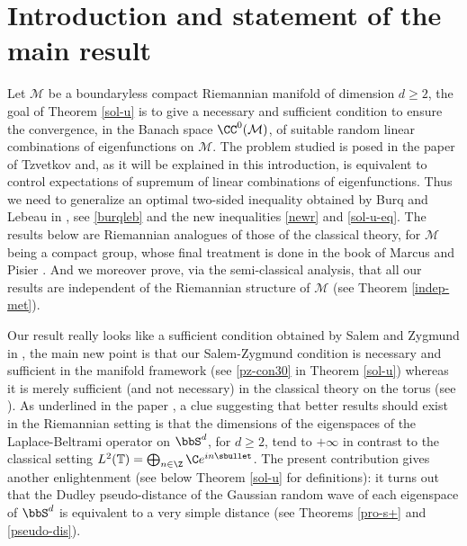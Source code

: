 \section{Introduction and statement of the main result}
Let $\mathcal{M}$ be a boundaryless compact Riemannian manifold of dimension $d\geq 2$, the goal of Theorem \ref{sol-u} is to give a necessary and sufficient condition to ensure the convergence, in the Banach space $\CC^0(\mathcal{M})$, of suitable random linear combinations of eigenfunctions on $\mathcal{M}$. The problem studied is posed in the paper of Tzvetkov \cite[p.\,XV]{Tzvetkov4} and, as it will be explained in this introduction, is equivalent to control expectations of supremum of linear combinations of eigenfunctions. Thus we need to generalize an optimal two-sided inequality obtained by Burq and Lebeau in \cite{burq-lebeau,burq-lebeau2}, see \eqref{burqleb} and the new inequalities \eqref{newr} and \eqref{sol-u-eq}.
The results below are Riemannian analogues of those of the classical theory, for $\mathcal{M}$ being a compact group, whose final treatment is done in the book of Marcus and Pisier \cite{pisier1981}. And we moreover prove, via the semi-classical analysis, that all our results are independent of the Riemannian structure of $\mathcal{M}$ (see Theorem \ref{indep-met}).%

Our result really looks like a sufficient condition obtained by Salem and Zygmund in \cite[p.\,291]{salem1954}, the main new point is that our Salem-Zygmund condition is necessary and sufficient in the manifold framework (see \eqref{pz-con30} in Theorem \ref{sol-u}) whereas it is merely sufficient (and not necessary) in the classical theory on the torus (see \cite[p.\,292]{salem1954}). As underlined in the paper \cite{burq-lebeau}, a clue suggesting that better results should exist in the Riemannian setting is that the dimensions of the eigenspaces of the Laplace-Beltrami operator on $\bbS^d$, for $d\geq 2$, tend to $+\infty$ in contrast to the classical setting $L^2(\mathbb{T})=\bigoplus_{n\in \Z} \C e^{in\sbullet}$. The present contribution gives another enlightenment (see \hbox{below} Theorem \ref{sol-u} for definitions): it turns out that the Dudley pseudo-distance of the Gaussian random wave of each eigenspace of $\bbS^d$ is equivalent to a very simple distance (see Theorems \ref{pro-s+} and \ref{pseudo-dis}).


